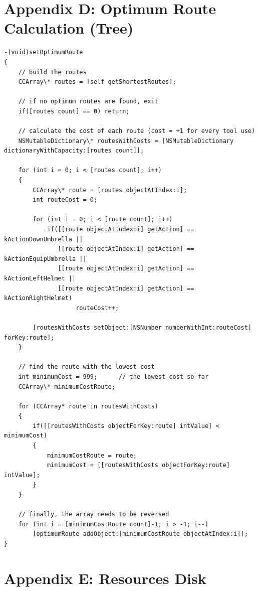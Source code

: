\documentclass[a4paper,oneside]{report}
\begin{document}
\section{Appendix D: Optimum Route Calculation (Tree)}
\begin{lstlisting}
-(void)setOptimumRoute
{    
    // build the routes
    CCArray\* routes = [self getShortestRoutes];
    
    // if no optimum routes are found, exit
    if([routes count] == 0) return;
    
    // calculate the cost of each route (cost = +1 for every tool use)
    NSMutableDictionary\* routesWithCosts = [NSMutableDictionary dictionaryWithCapacity:[routes count]];
    
    for (int i = 0; i < [routes count]; i++) 
    {
        CCArray\* route = [routes objectAtIndex:i];
        int routeCost = 0;
        
        for (int i = 0; i < [route count]; i++) 
            if([[route objectAtIndex:i] getAction] == kActionDownUmbrella ||
               [[route objectAtIndex:i] getAction] == kActionEquipUmbrella ||
               [[route objectAtIndex:i] getAction] == kActionLeftHelmet ||
               [[route objectAtIndex:i] getAction] == kActionRightHelmet) 
                    routeCost++;
        
        [routesWithCosts setObject:[NSNumber numberWithInt:routeCost] forKey:route];
    }
    
    // find the route with the lowest cost
    int minimumCost = 999;      // the lowest cost so far
    CCArray\* minimumCostRoute;
    
    for (CCArray* route in routesWithCosts) 
    {
        if([[routesWithCosts objectForKey:route] intValue] < minimumCost)
        {
            minimumCostRoute = route;
            minimumCost = [[routesWithCosts objectForKey:route] intValue];
        }
    }
    
    // finally, the array needs to be reversed
    for (int i = [minimumCostRoute count]-1; i > -1; i--) 
        [optimumRoute addObject:[minimumCostRoute objectAtIndex:i]];
}
\end{lstlisting}
\newpage

\section{Appendix E: Resources Disk}




	
%
%

\singlespace

\newpage
{}


\end{document}
